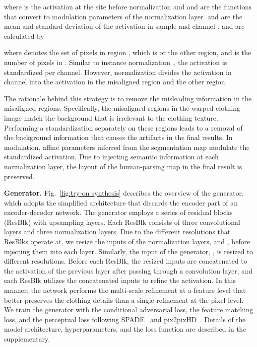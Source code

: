 where  is the activation at the site before normalization and  and  are the functions that convert  to modulation parameters of the normalization layer.
 and  are the mean and standard deviation of the activation in sample  and channel .
 and  are calculated by


where  denotes the set of pixels in region , which is  or the other region, and  is the number of pixels in .
Similar to instance normalization~\cite{ulyanov2016instance}, the activation is standardized per channel.
However, \norm normalization divides the activation in channel  into the activation in the misaligned region and the other region.

The rationale behind this strategy is to remove the misleading information in the misaligned regions.
Specifically, the misaligned regions in the warped clothing image match the background that is irrelevant to the clothing texture.
Performing a standardization separately on these regions leads to a removal of the background information that causes the artifacts in the final results.
In modulation, affine parameters inferred from the segmentation map modulate the standardized activation.
Due to injecting semantic information at each \norm normalization layer, the layout of the human-parsing map in the final result is preserved.

\textbf{\norm Generator.}
Fig.~\ref{fig:try-on synthesis} describes the overview of the \norm generator, which adopts the simplified architecture that discards the encoder part of an encoder-decoder network.
The generator employs a series of residual blocks (ResBlk) with upsampling layers.
Each \norm ResBlk consists of three convolutional layers and three \norm normalization layers. 
Due to the different resolutions that ResBlks operate at, we resize the inputs of the normalization layers,  and , before injecting them into each layer.
Similarly, the input of the generator, , is resized to different resolutions.
Before each ResBlk, the resized inputs  are concatenated to the activation of the previous layer after passing through a convolution layer, and each ResBlk utilizes the concatenated inputs to refine the activation.
In this manner, the network performs the multi-scale refinement at a feature level that better preserves the clothing details than a single refinement at the pixel level.
We train the \norm generator with the conditional adversarial loss, the feature matching loss, and the perceptual loss following SPADE~\cite{park2019semantic} and pix2pixHD~\cite{wang2018high}.
Details of the model architecture, hyperparameters, and the loss function are described in the supplementary.
